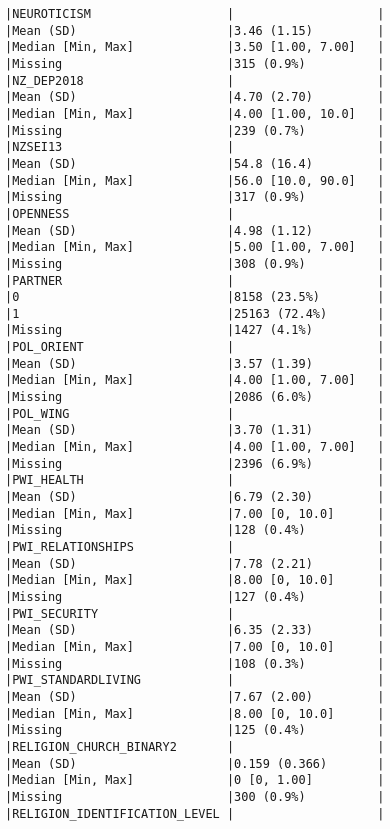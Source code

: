 \documentclass[
  singlecolumn]{report}
\begin{document}
\begin{verbatim}
|NEUROTICISM                   |                    |
|Mean (SD)                     |3.46 (1.15)         |
|Median [Min, Max]             |3.50 [1.00, 7.00]   |
|Missing                       |315 (0.9%)          |
|NZ_DEP2018                    |                    |
|Mean (SD)                     |4.70 (2.70)         |
|Median [Min, Max]             |4.00 [1.00, 10.0]   |
|Missing                       |239 (0.7%)          |
|NZSEI13                       |                    |
|Mean (SD)                     |54.8 (16.4)         |
|Median [Min, Max]             |56.0 [10.0, 90.0]   |
|Missing                       |317 (0.9%)          |
|OPENNESS                      |                    |
|Mean (SD)                     |4.98 (1.12)         |
|Median [Min, Max]             |5.00 [1.00, 7.00]   |
|Missing                       |308 (0.9%)          |
|PARTNER                       |                    |
|0                             |8158 (23.5%)        |
|1                             |25163 (72.4%)       |
|Missing                       |1427 (4.1%)         |
|POL_ORIENT                    |                    |
|Mean (SD)                     |3.57 (1.39)         |
|Median [Min, Max]             |4.00 [1.00, 7.00]   |
|Missing                       |2086 (6.0%)         |
|POL_WING                      |                    |
|Mean (SD)                     |3.70 (1.31)         |
|Median [Min, Max]             |4.00 [1.00, 7.00]   |
|Missing                       |2396 (6.9%)         |
|PWI_HEALTH                    |                    |
|Mean (SD)                     |6.79 (2.30)         |
|Median [Min, Max]             |7.00 [0, 10.0]      |
|Missing                       |128 (0.4%)          |
|PWI_RELATIONSHIPS             |                    |
|Mean (SD)                     |7.78 (2.21)         |
|Median [Min, Max]             |8.00 [0, 10.0]      |
|Missing                       |127 (0.4%)          |
|PWI_SECURITY                  |                    |
|Mean (SD)                     |6.35 (2.33)         |
|Median [Min, Max]             |7.00 [0, 10.0]      |
|Missing                       |108 (0.3%)          |
|PWI_STANDARDLIVING            |                    |
|Mean (SD)                     |7.67 (2.00)         |
|Median [Min, Max]             |8.00 [0, 10.0]      |
|Missing                       |125 (0.4%)          |
|RELIGION_CHURCH_BINARY2       |                    |
|Mean (SD)                     |0.159 (0.366)       |
|Median [Min, Max]             |0 [0, 1.00]         |
|Missing                       |300 (0.9%)          |
|RELIGION_IDENTIFICATION_LEVEL |                    |

\end{verbatim}
\end{document}
